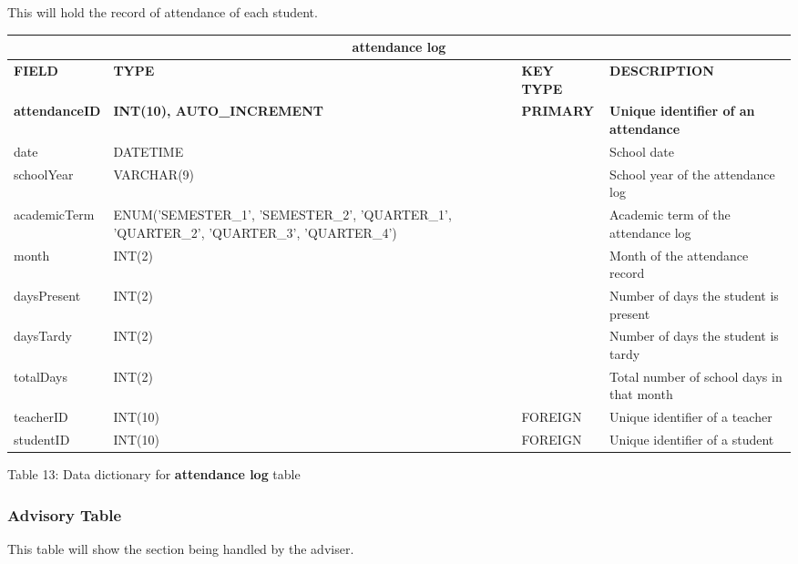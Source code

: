 \documentclass[11pt,a4paper,titlepage]{article}
\begin{document}
This will hold the record of attendance of each student.

\vspace{1cm}
\begin{longtable}{ |p{2.5cm}|p{4.5cm}|p{2.5cm}|p{3cm}|  }
    \hline
    \multicolumn{4}{|c|}{\textbf{attendance log}} \\
    \hline
    \textbf{FIELD}&\textbf{TYPE}&\textbf{KEY TYPE}&\textbf{DESCRIPTION}\\
    \hline
    \textbf{attendanceID}  & \textbf{INT(10), AUTO\_INCREMENT} & \textbf{PRIMARY} & \textbf{Unique identifier of an attendance}\\ \hline
    date   & DATETIME   & & School date\\ \hline
    schoolYear   & VARCHAR(9)   & & School year of the attendance log\\ \hline
    academicTerm   & ENUM('SEMESTER\_1', 'SEMESTER\_2', 'QUARTER\_1', 'QUARTER\_2', 'QUARTER\_3', 'QUARTER\_4') &  & Academic term of the attendance log\\ \hline
    month   & INT(2) &  & Month of the attendance record\\ \hline
    daysPresent   & INT(2) &  & Number of days the student is present\\ \hline
    daysTardy   & INT(2) &  & Number of days the student is tardy\\ \hline
    totalDays   & INT(2) &  & Total number of school days in that month\\ \hline
    teacherID   & INT(10)   & FOREIGN & Unique identifier of a teacher\\ \hline
    studentID   & INT(10)   & FOREIGN & Unique identifier of a student\\ \hline
\end{longtable}

\vspace{.5cm}
\begin{center}
    Table 13: Data dictionary for \textbf{attendance log} table
\end{center}


\subsubsection{Advisory Table}

This table will show the section being handled by the adviser.
\end{document}
